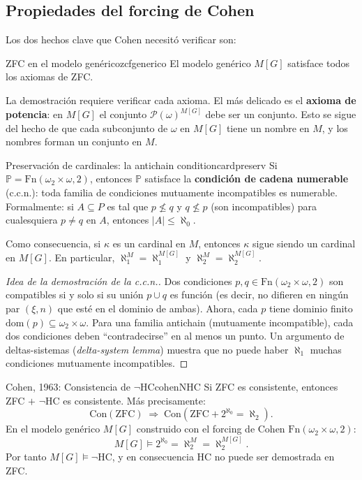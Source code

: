 \subsection{Propiedades del forcing de Cohen}

Los dos hechos clave que Cohen necesitó verificar son:

\begin{teorema}{ZFC en el modelo genérico}{zcfgenerico}
El modelo genérico $M[G]$ satisface todos los axiomas de ZFC.
\end{teorema}

La demostración requiere verificar cada axioma. El más delicado es el \textbf{axioma de potencia}: en $M[G]$ el conjunto $\mathcal{P}(\omega)^{M[G]}$ debe ser un conjunto. Esto se sigue del hecho de que cada subconjunto de $\omega$ en $M[G]$ tiene un nombre en $M$, y los nombres forman un conjunto en $M$.

\begin{teorema}{Preservación de cardinales: la antichain condition}{cardpreserv}
Si $\mathbb{P} = \mathrm{Fn}(\omega_2 \times \omega, 2)$, entonces $\mathbb{P}$ satisface la \textbf{condición de cadena numerable} (c.c.n.): toda familia de condiciones mutuamente incompatibles es numerable. Formalmente: si $A \subseteq P$ es tal que $p \not\leq q$ y $q \not\leq p$ (son incompatibles) para cualesquiera $p \neq q$ en $A$, entonces $|A| \leq \aleph_0$.

Como consecuencia, si $\kappa$ es un cardinal en $M$, entonces $\kappa$ sigue siendo un cardinal en $M[G]$. En particular, $\aleph_1^M = \aleph_1^{M[G]}$ y $\aleph_2^M = \aleph_2^{M[G]}$.
\end{teorema}

\begin{proof}[Idea de la demostración de la c.c.n.]
Dos condiciones $p, q \in \mathrm{Fn}(\omega_2 \times \omega, 2)$ son compatibles si y solo si su unión $p \cup q$ es función (es decir, no difieren en ningún par $(\xi, n)$ que esté en el dominio de ambas). Ahora, cada $p$ tiene dominio finito $\mathrm{dom}(p) \subseteq \omega_2 \times \omega$. Para una familia antichain (mutuamente incompatible), cada dos condiciones deben ``contradecirse'' en al menos un punto. Un argumento de deltas-sistemas (\emph{delta-system lemma}) muestra que no puede haber $\aleph_1$ muchas condiciones mutuamente incompatibles.
\end{proof}

\begin{teorema}{Cohen, 1963: Consistencia de $\neg$HC}{cohenNHC}
Si ZFC es consistente, entonces ZFC $+$ $\neg$HC es consistente. Más precisamente:
\[
  \mathrm{Con}(\mathrm{ZFC}) \;\Rightarrow\; \mathrm{Con}(\mathrm{ZFC} + 2^{\aleph_0} = \aleph_2).
\]
En el modelo genérico $M[G]$ construido con el forcing de Cohen $\mathrm{Fn}(\omega_2 \times \omega, 2)$:
\[
  M[G] \models 2^{\aleph_0} = \aleph_2^M = \aleph_2^{M[G]}.
\]
Por tanto $M[G] \models \neg\mathrm{HC}$, y en consecuencia HC no puede ser demostrada en ZFC.
\end{teorema}

